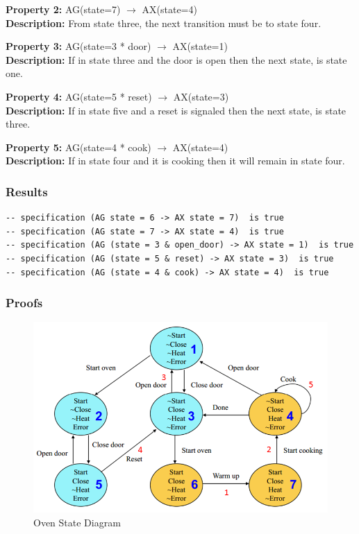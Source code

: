 \documentclass[11pt]{article}
\begin{document}
		\textbf{Property 2:} AG(state=7) $\to$ AX(state=4)\\ 
		\textbf{Description:} From state three, the next transition must be to state four. \\
		\vspace{12pt}
		
		\textbf{Property 3:} 	AG(state=3 * door) $\to$ AX(state=1)\\ 
		\textbf{Description:} If in state three and the door is open then the next state, is state one. \\
		\vspace{12pt}
		
		\textbf{Property 4:} AG(state=5 * reset) $\to$ AX(state=3) \\
		\textbf{Description:} If in state five and a reset is signaled then the next state, is state three.\\
		\vspace{12pt}
		
		\textbf{Property 5:} AG(state=4 * cook) $\to$ AX(state=4)  \\
		\textbf{Description:} If in state four and it is cooking then it will remain in state four.\\
		
		
	
	\subsubsection{Results}
		\begin{lstlisting}[caption=NuSMV Kripke Diagram Output, label=p2_2_out]	
-- specification (AG state = 6 -> AX state = 7)  is true
-- specification (AG state = 7 -> AX state = 4)  is true
-- specification (AG (state = 3 & open_door) -> AX state = 1)  is true
-- specification (AG (state = 5 & reset) -> AX state = 3)  is true
-- specification (AG (state = 4 & cook) -> AX state = 4)  is true
		\end{lstlisting}
	
	
	\subsubsection{Proofs}
	
	\begin{figure}[h]\centering
	\includegraphics[height=0.45\textwidth]{images/p2_2_proof.png}
		\caption{Oven State Diagram}
			\label{p2_p}
		\end{figure}
\end{document}

